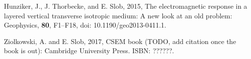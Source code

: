 \documentclass[fontsize=9pt, parskip=half, notitlepage, fleqn]{scrartcl}
\begin{document}

\begin{thebibliography}{}
\itemsep0pt

Hunziker, J., J. Thorbecke, and E. Slob, 2015, The electromagnetic response in
  a layered vertical transverse isotropic medium: A new look at an old problem:
  Geophysics, {\bf 80}, F1--F18, doi: 10.1190/geo2013-0411.1.

Ziolkowski, A. and E. Slob, 2017, CSEM book (TODO, add citation once the book
  is out): Cambridge University Press.  ISBN: ??????.

\end{thebibliography}
\end{document}
